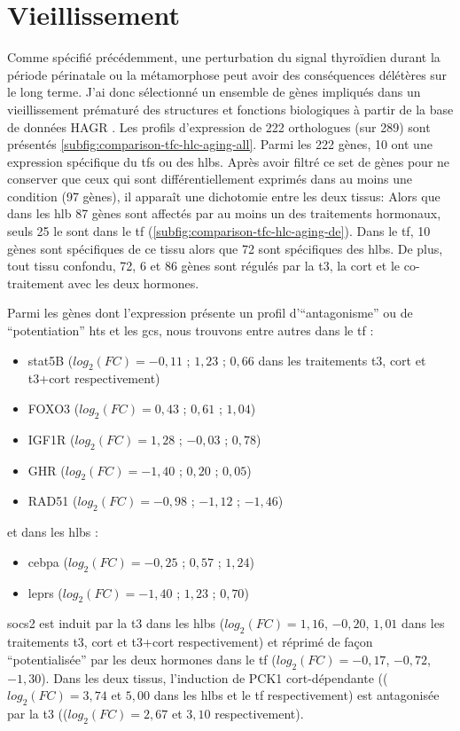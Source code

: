 \documentclass[../main.tex]{subfiles}
\begin{document}
	


\section{Vieillissement}

	Comme spécifié précédemment, une perturbation du signal thyroïdien durant la période périnatale ou la métamorphose peut avoir des conséquences délétères sur le long terme.
	J'ai donc sélectionné un ensemble de gènes impliqués dans un vieillissement prématuré des structures et fonctions biologiques à partir de la base de données HAGR \citep{DeMagalhaes2005}.
	Les profils d'expression de 222 orthologues (sur 289) sont présentés \autoref{subfig:comparison-tfc-hlc-aging-all}.
	Parmi les 222 gènes, 10 ont une expression spécifique du \glspl{tf} ou des \glspl{hlb}.
	Après avoir filtré ce set de gènes pour ne conserver que ceux qui sont différentiellement exprimés dans au moins une condition (97 gènes), il apparaît une dichotomie entre les deux tissus:
	Alors que dans les \gls{hlb} 87 gènes sont affectés par au moins un des traitements hormonaux, seuls 25 le sont dans le \gls{tf} (\autoref{subfig:comparison-tfc-hlc-aging-de}).
	Dans le \gls{tf}, 10 gènes sont spécifiques de ce tissu alors que 72 sont spécifiques des \glspl{hlb}. 
	De plus, tout tissu confondu, 72, 6 et 86 gènes sont régulés par la \gls{t3}, la \gls{cort} et le co-traitement avec les deux hormones.
	\par
	Parmi les gènes dont l'expression présente un profil d'``antagonisme'' ou de ``potentiation'' \glspl{ht} et les \glspl{gc}, nous trouvons entre autres dans le \gls{tf} :
	\begin{itemize}
	\item \gls{stat5}B ($log_2(FC)=-0,11$ ; $1,23$ ; $0,66$ dans les traitements \gls{t3}, \gls{cort} et \gls{t3}+\gls{cort} respectivement)
	\item FOXO3 ($log_2(FC)=0,43$ ; $0,61$ ; $1,04$)
	\item IGF1R ($log_2(FC)=1,28$ ; $-0,03$ ; $0,78$)
	\item GHR ($log_2(FC)=-1,40$ ; $0,20$ ; $0,05$)
	\item RAD51 ($log_2(FC)=-0,98$ ; $-1,12$ ; $-1,46$)
	\end{itemize}
	et dans les \glspl{hlb} :
	\begin{itemize}
	\item \gls{cebpa} ($log_2(FC)=-0,25$ ; $0,57$ ; $1,24$)
	\item \glspl{lepr} ($log_2(FC)=-1,40$ ; $1,23$ ; $0,70$)
	\end{itemize}
	\par
	\gls{socs2} est induit par la \gls{t3} dans les \glspl{hlb} ($log_2(FC)=1,16$, $-0,20$, $1,01$ dans les traitements \gls{t3}, \gls{cort} et \gls{t3}+\gls{cort} respectivement) et réprimé de façon ``potentialisée'' par les deux hormones dans le \gls{tf} ($log_2(FC)=-0,17$, $-0,72$, $-1,30$).
	Dans les deux tissus, l'induction de PCK1 \gls{cort}-dépendante (($log_2(FC)=3,74$ et $5,00$ dans les \glspl{hlb} et le \gls{tf} respectivement) est antagonisée par la \gls{t3} (($log_2(FC)=2,67$ et $3,10$ respectivement).
\end{document}
